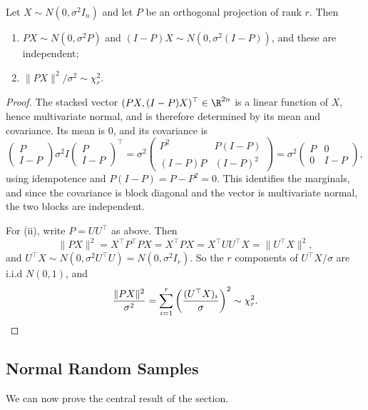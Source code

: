 \begin{theorem}\label{thm:proj}
  Let $X \sim N(0,\sigma^2 I_n)$ and let $P$ be an orthogonal projection of rank $r$. Then
  \begin{enumerate}[label=(\roman*)]
    \item $PX \sim N(0,\sigma^2P)$ and $(I-P)X \sim N(0,\sigma^2(I-P))$, and these are independent;
    \item $\|PX\|^2/\sigma^2 \sim \chi^2_r$.
  \end{enumerate}
\end{theorem}
\begin{proof}
  The stacked vector $(PX, (I-P)X)^\top \in \R^{2n}$ is a linear function of $X$, hence multivariate normal, and is therefore determined by its mean and covariance. Its mean is $0$, and its covariance is
  $$
  \begin{pmatrix}P\\I-P\end{pmatrix}\sigma^2 I \begin{pmatrix}P\\I-P\end{pmatrix}^\top
  = \sigma^2\begin{pmatrix}P^2 & P(I-P)\\(I-P)P & (I-P)^2\end{pmatrix} = \sigma^2\begin{pmatrix}P&0\\0&I-P\end{pmatrix},
  $$
  using idempotence and $P(I-P) = P - P^2 = 0$. This identifies the marginals, and since the covariance is block diagonal and the vector is multivariate normal, the two blocks are independent.

  For (ii), write $P = UU^\top$ as above. Then
  $$
  \|PX\|^2 = X^\top P^\top P X = X^\top P X = X^\top U U^\top X = \|U^\top X\|^2,
  $$
  and $U^\top X \sim N(0, \sigma^2 U^\top U) = N(0,\sigma^2 I_r)$. So the $r$ components of $U^\top X/\sigma$ are i.i.d $N(0,1)$, and
  $$
  \frac{\|PX\|^2}{\sigma^2} = \sum_{i=1}^{r}\left(\frac{(U^\top X)_i}{\sigma}\right)^2 \sim \chi^2_r. \qedhere
  $$
\end{proof}

\subsection{Normal Random Samples}

We can now prove the central result of the section.

